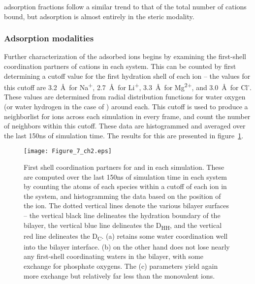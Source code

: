 \cl adsorption fractions follow a similar trend to that of the total number of cations bound, but adsorption
is almost entirely in the steric modality.




\subsubsection{Adsorption modalities}

Further characterization of the adsorbed ions begins by examining the first-shell coordination partners of cations in each system.
This can be counted by first determining a cutoff value for the first hydration shell of each ion 
-- the values for this cutoff are
3.2~\AA~for Na\textsuperscript{+}, 2.7~\AA~for Li\textsuperscript{+}, 3.3~\AA~for Mg\textsuperscript{2+}, 
and 3.0~\AA~for Cl\textsuperscript{-}. 
These values are determined from radial distribution 
functions for water oxygen (or water hydrogen in the case of \cl) around each. 
This cutoff is used to produce a neighborlist for ions
across each simulation in every frame, and count the number of neighbors within this cutoff. 
These data {are} histogrammed and averaged over
the last 150ns of simulation time. The results for this are presented in figure~\ref{fig:cood:ch2}.
\begin{figure}
    \caption[Coordination partners for \li and \mg]{First shell coordination partners 
        for \li and \mg in each simulation. 
        These are computed over the last 150ns of 
        simulation time in each system by counting 
        the atoms of each species within a cutoff 
        of each ion in the system, and histogramming 
        the data based on the position of the ion. 
        The dotted vertical lines denote the various 
        bilayer surfaces -- the vertical black
        line delineates the hydration boundary of the bilayer,
        the vertical blue line delineates the D\textsubscript{HH},
        and the vertical red line delineates the D\textsubscript{C}.
        \li (a) retains some water 
        coordination well into the bilayer
        interface.
        \mgmbnbfix (b) on the other hand does not lose
        nearly any first-shell coordinating
        waters in the bilayer, with some exchange for phosphate
        oxygens. The \mgmicro (c) parameters yield again more exchange but 
        relatively far less than the monovalent
    ions.}
    \label{fig:cood:ch2}
    \texttt{[image: Figure\_7\_ch2.eps]}
\end{figure}

